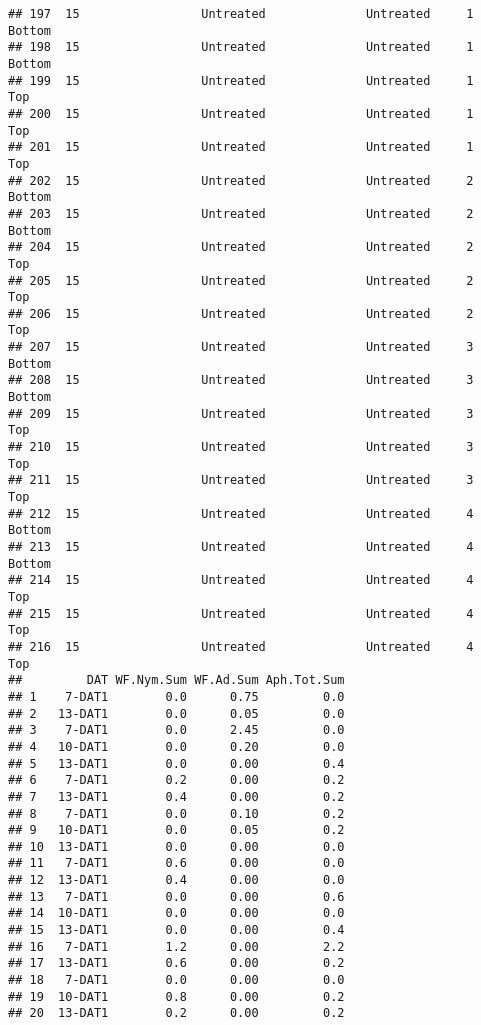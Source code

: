 \documentclass[
]{article}
\begin{document}
\begin{verbatim}
## 197  15                 Untreated              Untreated     1        Bottom
## 198  15                 Untreated              Untreated     1        Bottom
## 199  15                 Untreated              Untreated     1           Top
## 200  15                 Untreated              Untreated     1           Top
## 201  15                 Untreated              Untreated     1           Top
## 202  15                 Untreated              Untreated     2        Bottom
## 203  15                 Untreated              Untreated     2        Bottom
## 204  15                 Untreated              Untreated     2           Top
## 205  15                 Untreated              Untreated     2           Top
## 206  15                 Untreated              Untreated     2           Top
## 207  15                 Untreated              Untreated     3        Bottom
## 208  15                 Untreated              Untreated     3        Bottom
## 209  15                 Untreated              Untreated     3           Top
## 210  15                 Untreated              Untreated     3           Top
## 211  15                 Untreated              Untreated     3           Top
## 212  15                 Untreated              Untreated     4        Bottom
## 213  15                 Untreated              Untreated     4        Bottom
## 214  15                 Untreated              Untreated     4           Top
## 215  15                 Untreated              Untreated     4           Top
## 216  15                 Untreated              Untreated     4           Top
##         DAT WF.Nym.Sum WF.Ad.Sum Aph.Tot.Sum
## 1    7-DAT1        0.0      0.75         0.0
## 2   13-DAT1        0.0      0.05         0.0
## 3    7-DAT1        0.0      2.45         0.0
## 4   10-DAT1        0.0      0.20         0.0
## 5   13-DAT1        0.0      0.00         0.4
## 6    7-DAT1        0.2      0.00         0.2
## 7   13-DAT1        0.4      0.00         0.2
## 8    7-DAT1        0.0      0.10         0.2
## 9   10-DAT1        0.0      0.05         0.2
## 10  13-DAT1        0.0      0.00         0.0
## 11   7-DAT1        0.6      0.00         0.0
## 12  13-DAT1        0.4      0.00         0.0
## 13   7-DAT1        0.0      0.00         0.6
## 14  10-DAT1        0.0      0.00         0.0
## 15  13-DAT1        0.0      0.00         0.4
## 16   7-DAT1        1.2      0.00         2.2
## 17  13-DAT1        0.6      0.00         0.2
## 18   7-DAT1        0.0      0.00         0.0
## 19  10-DAT1        0.8      0.00         0.2
## 20  13-DAT1        0.2      0.00         0.2

\end{verbatim}
\end{document}
